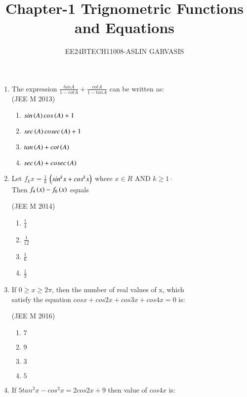 \documentclass[journal,10pt,twocolumn]{IEEEtran}
\theoremstyle{remark}
\begin{document}

\vspace{3cm}
\title{Chapter-1 Trignometric Functions and Equations}
\author{EE24BTECH11008-ASLIN GARVASIS}
\maketitle

\begin{enumerate}\addtocounter{enumi}{13}

\item The expression $\frac{tan A}{1-cot A} +\frac{cot A}{1-tan A}$ can be written as:\\

\hfill {(JEE M 2013)}\\
\begin{enumerate}
\item $sin\left(A\right)cos\left(A\right)+1$
\item $sec\left(A\right)cosec\left(A\right)+1$
\item $tan\left(A\right)+cot\left(A\right)$ 
\item $sec\left(A\right)+cosec\left(A\right)$
\end{enumerate}
\item Let $f_{k}x=\frac{1}{k}$ $\left(sin^{k}x+cos^{k}x\right)$ where $x\in R$ AND $k\geq 1 \cdot $\\
 Then $f_{4}\left(x\right)-f_{6}\left(x\right)$ equals

\hfill {(JEE M 2014)}\\
    \begin{enumerate}
    \item  $\frac{1}{4}$ 
     \item $\frac{1}{12}$
    \item $\frac{1}{6}$
    \item $\frac{1}{3}$
    \end{enumerate}
\item If $0 \ge x \ge 2\pi$, then the number of real values of x, which \\  satisfy the equation $cosx+cos2x+cos3x+cos4x=0$ is:

\hfill {(JEE M 2016)}\\
    \begin{enumerate}
    \item $7$
    \item $9$
    \item $3$
    \item $5$
    \end{enumerate}
    
\item If $5${$tan^2x-cos^2x=2cos2x+9$} then value of $cos 4x$ is:


\end{enumerate}
\end{document}
